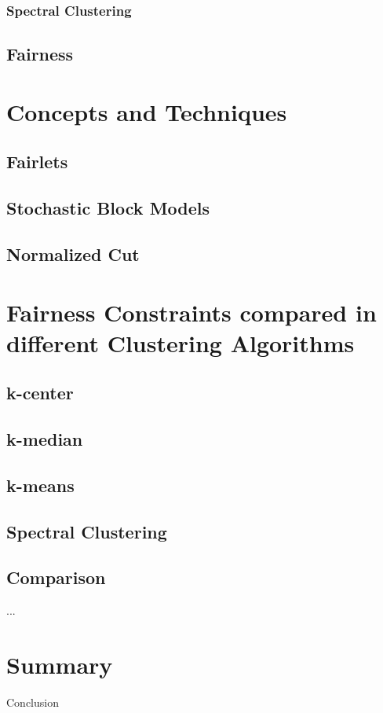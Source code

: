 \subsubsection{Spectral Clustering}
\textcite[]{VonLuxburg2007}
\textcite[]{Ng2001}

\subsection{Fairness}
\textcite[]{Chierichetti2018}


\section{Concepts and Techniques}

\subsection{Fairlets}
\textcite[]{Chierichetti2018}

\subsection{Stochastic Block Models}
\textcite[]{Lei2013}

\subsection{Normalized Cut}
\textcite[]{Eriksson2011}
\textcite[]{Xu2010}
\textcite[]{Yu2004}

\section{Fairness Constraints compared in different Clustering Algorithms}

\subsection{k-center}
\textcite[]{Chierichetti2018}

\subsection{k-median}
\textcite[]{Chierichetti2018}

\subsection{k-means}
\textcite[]{Schmidt2018}

\subsection{Spectral Clustering}
\textcite[]{Kawale2013}

\subsection{Comparison}
...

\section{Summary}
Conclusion
